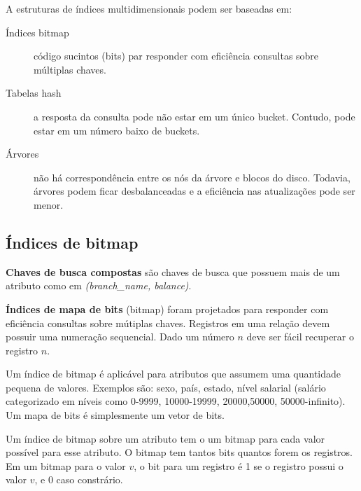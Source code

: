 A estruturas de índices multidimensionais podem ser baseadas em:
\begin{description}
\item[Índices bitmap] código sucintos (bits) par responder com eficiência 
consultas sobre múltiplas chaves.

\item[Tabelas hash] a resposta da consulta pode não estar em um único bucket.
Contudo, pode estar em um número baixo de buckets.

\item[Árvores] não há correspondência entre os nós da árvore e blocos do disco.
Todavia, árvores podem ficar desbalanceadas e a eficiência nas atualizações
pode ser menor.
\end{description}

\subsection{Índices de bitmap}

\textbf{Chaves de busca compostas} são chaves de busca que possuem
mais de um atributo como em \emph{(branch\_name, balance)}.

\textbf{Índices de mapa de bits} (bitmap) foram projetados para responder com
eficiência consultas sobre mútiplas chaves.
Registros em uma relação devem possuir uma numeração sequencial. 
Dado um número $n$ deve ser fácil recuperar o registro $n$.

Um índice de bitmap é aplicável para atributos que assumem uma quantidade pequena de valores.
Exemplos são: sexo, país, estado, nível salarial (salário categorizado em níveis como 
0-9999, 10000-19999, 20000,50000, 50000-infinito).
Um mapa de bits é simplesmente um vetor de bits.

Um índice de bitmap sobre um atributo tem o um bitmap para cada valor possível
para esse atributo.
O bitmap tem tantos bits quantos forem os registros. 
Em um bitmap para o valor $v$, o bit para um registro é 1 se o 
registro possui o valor $v$, e 0 caso constrário.


